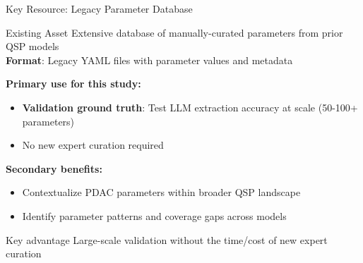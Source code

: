 \documentclass[10pt]{beamer}
\begin{document}
\begin{frame}{Key Resource: Legacy Parameter Database}

  \begin{block}{Existing Asset}
    Extensive database of manually-curated parameters from prior QSP models\\
    \textbf{Format}: Legacy YAML files with parameter values and metadata
  \end{block}

  \vspace{0.3cm}

  \textbf{Primary use for this study:}
  \begin{itemize}
    \item \textbf{Validation ground truth}: Test LLM extraction accuracy at scale (50-100+ parameters)
    \item No new expert curation required
  \end{itemize}

  \vspace{0.3cm}

  \textbf{Secondary benefits:}
  \begin{itemize}
    \item Contextualize PDAC parameters within broader QSP landscape
    \item Identify parameter patterns and coverage gaps across models
  \end{itemize}

  \vspace{0.3cm}

  \begin{alertblock}{Key advantage}
    Large-scale validation without the time/cost of new expert curation
  \end{alertblock}

\end{frame}
\end{document}
